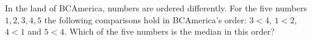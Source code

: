 In the land of BCAmerica, numbers are ordered differently. For the five numbers $1,2,3,4,5$ the following comparisons hold in BCAmerica's order: $3<4$, $1<2$, $4<1$ and $5<4$. Which of the five numbers is the median in this order?
